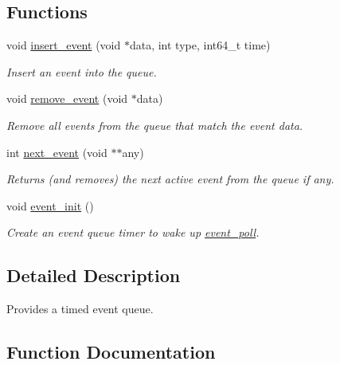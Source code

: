 \subsection*{Functions}
\begin{DoxyCompactItemize}
\item 
void \hyperlink{group__event__queue_gaa77118055993ed58322ec2de84b2a882}{insert\+\_\+event} (void $\ast$data, int type, int64\+\_\+t time)
\begin{DoxyCompactList}\small\item\em Insert an event into the queue. \end{DoxyCompactList}\item 
void \hyperlink{group__event__queue_ga6dc3ba93481bf089b19ce108d04711e6}{remove\+\_\+event} (void $\ast$data)
\begin{DoxyCompactList}\small\item\em Remove all events from the queue that match the event data. \end{DoxyCompactList}\item 
int \hyperlink{group__event__queue_gabf7fc29f08e3723a690036b3d0c63d81}{next\+\_\+event} (void $\ast$$\ast$any)
\begin{DoxyCompactList}\small\item\em Returns (and removes) the next active event from the queue if any. \end{DoxyCompactList}\item 
\mbox{\label{group__event__queue_ga0675272d0bed0894084544d46b5417a0}} 
void \hyperlink{group__event__queue_ga0675272d0bed0894084544d46b5417a0}{event\+\_\+init} ()
\begin{DoxyCompactList}\small\item\em Create an event queue timer to wake up \hyperlink{group__event_gaab7ac3049413d657bde5b7a6ae33c128}{event\+\_\+poll}. \end{DoxyCompactList}\end{DoxyCompactItemize}


\subsection{Detailed Description}
Provides a timed event queue. 

\subsection{Function Documentation}
\mbox{\label{group__event__queue_gaa77118055993ed58322ec2de84b2a882}} 
